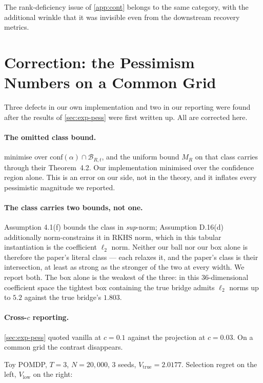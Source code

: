The rank-deficiency issue of \cref{app:cont} belongs to the same category, with
the additional wrinkle that it was invisible even from the downstream recovery
metrics.

\section{Correction: the Pessimism Numbers on a Common Grid}
\label{app:pess-correction}

Three defects in our own implementation and two in our reporting were found after
the results of \cref{sec:exp-pess} were first written up. All are corrected here.

\paragraph{The omitted class bound.} \citet{hong2024} minimise over
$\mathrm{conf}(\alpha) \cap \mathcal{B}_{R,t}$, and the uniform bound $M_R$ on
that class carries through their Theorem~4.2. Our implementation minimised over
the confidence region alone. This is an error on our side, not in the theory, and
it inflates every pessimistic magnitude we reported.

\paragraph{The class carries two bounds, not one.} Assumption 4.1(f) bounds the
class in \emph{sup}-norm; Assumption D.16(d) additionally norm-constrains it in
RKHS norm, which in this tabular instantiation is the coefficient $\ell_2$ norm.
Neither our ball nor our box alone is therefore the paper's literal class ---
each relaxes it, and the paper's class is their intersection, at least as strong
as the stronger of the two at every width. We report both. The box alone is the
weakest of the three: in this $36$-dimensional coefficient space the tightest box
containing the true bridge admits $\ell_2$ norms up to $5.2$ against the true
bridge's $1.803$.

\paragraph{Cross-$c$ reporting.} \cref{sec:exp-pess} quoted vanilla at $c{=}0.1$
against the projection at $c{=}0.03$. On a common grid the contrast disappears.

Toy POMDP, $T{=}3$, $N{=}20{,}000$, $3$ seeds, $V_{\mathrm{true}} = 2.0177$.
Selection regret on the left, $V_{\mathrm{low}}$ on the right:

